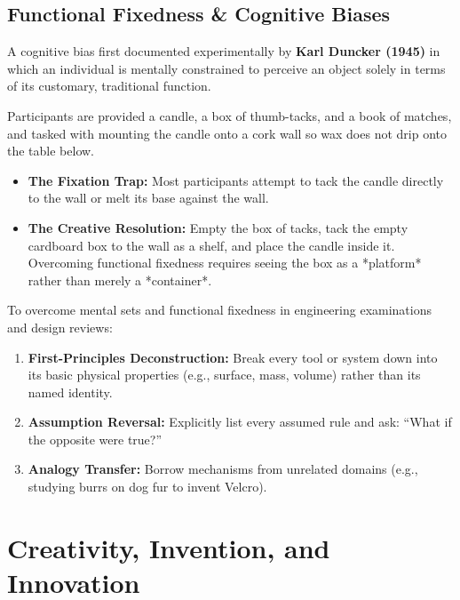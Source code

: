 \subsection{Functional Fixedness \& Cognitive Biases}
\begin{definition}
A cognitive bias first documented experimentally by \textbf{Karl Duncker (1945)} in which an individual is mentally constrained to perceive an object solely in terms of its customary, traditional function.
\end{definition}

\begin{example}
Participants are provided a candle, a box of thumb-tacks, and a book of matches, and tasked with mounting the candle onto a cork wall so wax does not drip onto the table below. 
\begin{itemize}[leftmargin=1.2em]
    \item \textbf{The Fixation Trap:} Most participants attempt to tack the candle directly to the wall or melt its base against the wall.
    \item \textbf{The Creative Resolution:} Empty the box of tacks, tack the empty cardboard box to the wall as a shelf, and place the candle inside it. Overcoming functional fixedness requires seeing the box as a *platform* rather than merely a *container*.
\end{itemize}
\end{example}

\begin{examtip}
To overcome mental sets and functional fixedness in engineering examinations and design reviews:
\begin{enumerate}[leftmargin=1.2em, itemsep=2pt]
    \item \textbf{First-Principles Deconstruction:} Break every tool or system down into its basic physical properties (e.g., surface, mass, volume) rather than its named identity.
    \item \textbf{Assumption Reversal:} Explicitly list every assumed rule and ask: ``What if the opposite were true?''
    \item \textbf{Analogy Transfer:} Borrow mechanisms from unrelated domains (e.g., studying burrs on dog fur to invent Velcro).
\end{enumerate}
\end{examtip}

\section{Creativity, Invention, and Innovation}

